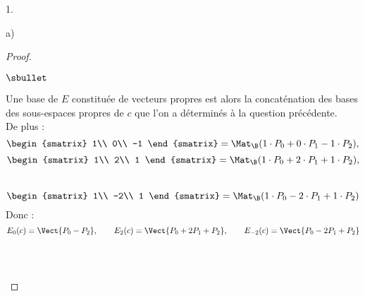\begin{noliste}{1.}
\begin{noliste}{a)}
\begin{proof}
\begin{noliste}{$\sbullet$}
      \item Une base de $E$ constituée de vecteurs propres est alors
        la concaténation des bases des sous-espaces propres de $c$ que
        l'on a déterminés à la question précédente.\\
        De plus :
        \[
        \begin{smatrix}
          1\\
          0\\
          -1
        \end{smatrix}
        = \Mat_{\B}(1 \cdot P_0+ 0\cdot P_1-1 \cdot P_2),
        \]
        \[
        \begin{smatrix}
          1\\
          2\\
          1
        \end{smatrix}
        = \Mat_{\B}(1 \cdot P_0+2 \cdot P_1+1\cdot P_2),
        \]~\\[-.8cm]
        \[
        \begin{smatrix}
          1\\
          -2\\
          1
        \end{smatrix}
        = \Mat_{\B}(1\cdot P_0-2\cdot P_1+1 \cdot P_2)
        \]
        Donc :
        \[
        E_0(c)=\Vect{P_0-P_2}, \qquad E_{2}(c)=\Vect{P_0+2P_1+P_2},
        \qquad E_{-2}(c)=\Vect{P_0-2P_1+P_2}
        \]~\\[-1.4cm]
      
        ~\\[-.8cm]
      \end{noliste}
    \end{proof}
  \end{noliste}
\end{noliste}



